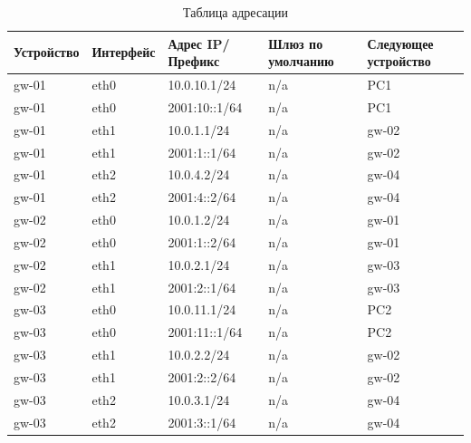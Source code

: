   \begin{table}[]
    \centering
    \caption{Таблица адресации}
    \label{tab2}
    \begin{tabular}{|l|l|l|l|l|}
      \hline
      Устройство & Интерфейс & Адрес IP/Префикс & Шлюз по умолчанию & Следующее устройство \\ \hline
      gw-01      & eth0      & 10.0.10.1/24     & n/a               & PC1                  \\ \hline
      gw-01      & eth0      & 2001:10::1/64    & n/a               & PC1                  \\ \hline
      gw-01      & eth1      & 10.0.1.1/24      & n/a               & gw-02                \\ \hline
      gw-01      & eth1      & 2001:1::1/64     & n/a               & gw-02                \\ \hline
      gw-01      & eth2      & 10.0.4.2/24      & n/a               & gw-04                \\ \hline
      gw-01      & eth2      & 2001:4::2/64     & n/a               & gw-04                \\ \hline
      gw-02      & eth0      & 10.0.1.2/24      & n/a               & gw-01                \\ \hline
      gw-02      & eth0      & 2001:1::2/64     & n/a               & gw-01                \\ \hline
      gw-02      & eth1      & 10.0.2.1/24      & n/a               & gw-03                \\ \hline
      gw-02      & eth1      & 2001:2::1/64     & n/a               & gw-03                \\ \hline
      gw-03      & eth0      & 10.0.11.1/24     & n/a               & PC2                  \\ \hline
      gw-03      & eth0      & 2001:11::1/64    & n/a               & PC2                  \\ \hline
      gw-03      & eth1      & 10.0.2.2/24      & n/a               & gw-02                \\ \hline
      gw-03      & eth1      & 2001:2::2/64     & n/a               & gw-02                \\ \hline
      gw-03      & eth2      & 10.0.3.1/24      & n/a               & gw-04                \\ \hline
      gw-03      & eth2      & 2001:3::1/64     & n/a               & gw-04                \\ \hline

\end{tabular}
\end{table}
